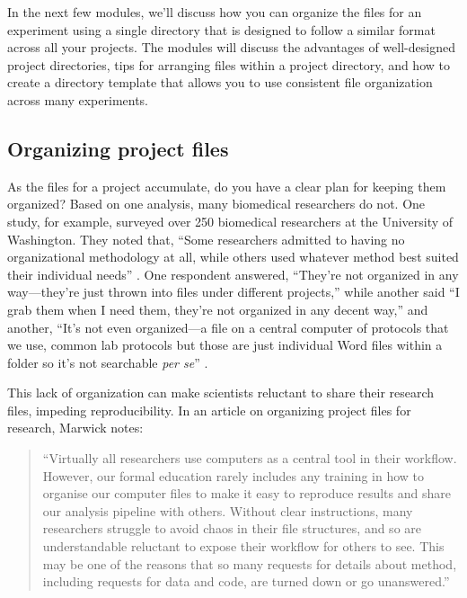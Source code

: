 \documentclass[]{tufte-book}
\begin{document}
In the next few modules, we'll discuss how you can organize the files for an
experiment using a single directory that is designed to follow a similar format
across all your projects. The modules will discuss the advantages
of well-designed project directories, tips for arranging files within a project
directory, and how to create a directory template that allows you to use
consistent file organization across many experiments.

\subsection{Organizing project files}\label{organizing-project-files}

As the files for a project accumulate, do you have a clear plan for keeping them
organized? Based on one analysis, many biomedical researchers do not. One study,
for example, surveyed over 250 biomedical researchers at the University of
Washington. They noted that, ``Some researchers admitted to having no
organizational methodology at all, while others used whatever method best suited
their individual needs'' \citep{anderson2007issues}. One respondent answered, ``They're
not organized in any way---they're just thrown into files under different
projects,'' while another said ``I grab them when I need them, they're not
organized in any decent way,'' and another, ``It's not even organized---a file on
a central computer of protocols that we use, common lab protocols but those are
just individual Word files within a folder so it's not searchable \emph{per se}''
\citep{anderson2007issues}.

This lack of organization can make scientists reluctant to share their research
files, impeding reproducibility. In an article on organizing project files for
research, Marwick notes:

\begin{quote}
``Virtually all researchers use computers as a central tool in their
workflow. However, our formal education rarely includes any training in
how to organise our computer files to make it easy to reproduce results
and share our analysis pipeline with others. Without clear instructions,
many researchers struggle to avoid chaos in their file structures, and so
are understandable reluctant to expose their workflow for others to see.
This may be one of the reasons that so many requests for details about
method, including requests for data and code, are turned down or go
unanswered.'' \citep{marwick2018packaging}
\end{quote}
\end{document}

